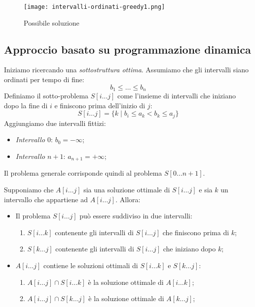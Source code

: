 \begin{figure}[h!]
    \centering
    \texttt{[image: intervalli-ordinati-greedy1.png]}
    \caption{Possibile soluzione}
\end{figure}

\subsection{Approccio basato su programmazione dinamica}
Iniziamo ricercando una \emph{sottostruttura ottima}. Assumiamo che gli intervalli
siano ordinati per tempo di fine:
\[b_1\leq\dots\leq b_n\]
Definiamo il sotto-problema $S[i\dots j]$ come l'insieme di intervalli che
iniziano dopo la fine di $i$ e finiscono prima dell'inizio di $j$:
\[S[i\dots j]=\{k\;|\;b_i\leq a_k<b_k\leq a_j\}\]
Aggiungiamo due intervalli fittizi:
\begin{itemize}
    \item \emph{Intervallo $0$}: $b_0=-\infty$;
    \item \emph{Intervallo $n+1$}: $a_{n+1}=+\infty$;
\end{itemize}
Il problema generale corrisponde quindi al problema $S[0\dots n+1]$.

\begin{definition}
    Supponiamo che $A[i\dots j]$ sia una soluzione ottimale di $S[i\dots j]$
    e sia $k$ un intervallo che appartiene ad $A[i\dots j]$. Allora:
    \begin{itemize}
        \item Il problema $S[i\dots j]$ può essere suddiviso in due intervalli:
        \begin{enumerate}
            \item $S[i\dots k]$ contenente gli intervalli di $S[i\dots j]$ che
            finiscono prima di $k$;
            \item $S[k\dots j]$ contenente gli intervalli di $S[i\dots j]$ che
            iniziano dopo $k$;
        \end{enumerate}
        \item $A[i\dots j]$ contiene le soluzioni ottimali di $S[i\dots k]$ e
        $S[k\dots j]$:
        \begin{enumerate}
            \item $A[i\dots j]\cap S[i\dots k]$ è la soluzione ottimale di $A[i\dots k]$;
            \item $A[i\dots j]\cap S[k\dots j]$ è la soluzione ottimale di $A[k\dots j]$;
        \end{enumerate}
    \end{itemize}
\end{definition}

